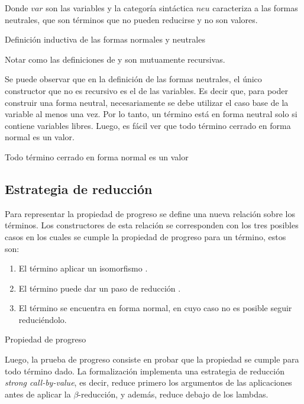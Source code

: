 Donde $var$ son las variables y la categoría sintáctica $neu$ caracteriza a las formas neutrales, que son términos que no pueden reducirse y no son valores.

\begin{codigo}
	Definición inductiva de las formas normales y neutrales
\end{codigo}

Notar como las definiciones de \type{$\Uparrow$} y \type{$\Downarrow$} son mutuamente recursivas.

Se puede observar que en la definición de las formas neutrales, el único constructor que no es recursivo es el de las variables.
Es decir que, para poder construir una forma neutral, necesariamente se debe utilizar el caso base de la variable al menos una vez.
Por lo tanto, un término está en forma neutral solo si contiene variables libres.
Luego, es fácil ver que todo término cerrado en forma normal es un valor.

\begin{codigo}
	Todo término cerrado en forma normal es un valor
\end{codigo}

\subsection{Estrategia de reducción}

Para representar la propiedad de progreso se define una nueva relación  sobre los términos.
Los constructores de esta relación se corresponden con los tres posibles casos en los cuales se cumple la propiedad de progreso para un término, estos son:
\begin{enumerate}
	\item El término aplicar un isomorfismo \type{$\_\rightleftarrows\_$}.
	\item El término puede dar un paso de reducción \type{$\_\hookrightarrow\_$}.
	\item El término se encuentra en forma normal, en cuyo caso no es posible seguir reduciéndolo.
\end{enumerate}

\begin{codigo}
	Propiedad de progreso
\end{codigo}

Luego, la prueba de progreso consiste en probar que la propiedad  se cumple para todo término dado.
La formalización implementa una estrategia de reducción \textit{strong call-by-value}, es decir, reduce primero los argumentos de las aplicaciones antes de aplicar la $\beta$-reducción, y además, reduce debajo de los lambdas.

